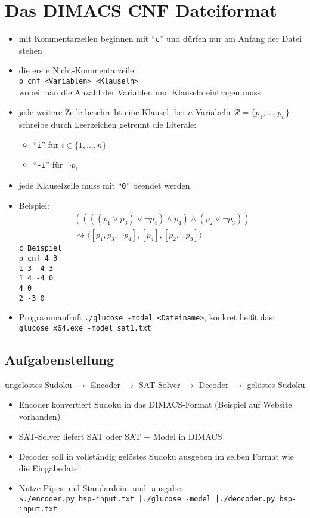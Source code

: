 \documentclass[12pt,a4paper]{article}
\author{Willi Sontopski}
\newcommand{\RR}{\mathcal{R}}
\begin{document}

\section*{Das DIMACS CNF Dateiformat}
\begin{itemize}
\item mit Kommentarzeilen beginnen mit ``\texttt{c}'' und dürfen nur am Anfang der Datei stehen
\item die erste Nicht-Kommentarzeile:\\ \texttt{p cnf <Variablen> <Klauseln>}\\ wobei man die Anzahl der Variablen und Klauseln eintragen muss
\item jede weitere Zeile beschreibt eine Klausel, bei $n$ Variabeln $\RR=\lbrace p_1,\ldots, p_n\rbrace$ schreibe durch Leerzeichen getrennt die Literale:
 \begin{itemize}
 \item ``\texttt{i}'' für $i\in\lbrace1,\ldots, n\rbrace$
 \item ``\texttt{-i}'' für $\neg p_i$
 \end{itemize}
 \item jede Klauselzeile muss mit ``\texttt{0}'' beendet werden.
\item Beispiel:
\begin{align*}
(((( p_1\vee p_3)\vee\neg p_4)\wedge p_4)\wedge (p_2\vee\neg p_3))\\
\rightsquigarrow
\big\langle [p_1, p_3,\neg p_4],[p_4],[p_2,\neg p_3]\big\rangle
\end{align*}
\texttt{c Beispiel\\
p cnf 4 3\\
1 3 -4 3\\
1 4 -4 0\\
4 0\\
2 -3 0}
\item Programmaufruf: \texttt{./glucose -model <Dateiname>}, konkret heißt das:\\
\texttt{glucose\_x64.exe -model sat1.txt}
\end{itemize}
\subsection*{Aufgabenstellung}
ungelöstes Sudoku $\to$ Encoder $\to$ SAT-Solver $\to$ Decoder $\to$ gelöstes Sudoku
\begin{itemize}
\item Encoder konvertiert Sudoku in das DIMACS-Format (Beispiel auf Website vorhanden)
\item SAT-Solver liefert SAT oder SAT + Model in DIMACS
\item Decoder soll in vollständig gelöstes Sudoku ausgeben im selben Format wie die Eingabedatei
\item Nutze Pipes und Standardein- und -ausgabe:\\
\texttt{\$./encoder.py bsp-input.txt |./glucose -model |./deocoder.py bsp-input.txt}
\end{itemize}
\end{document}
